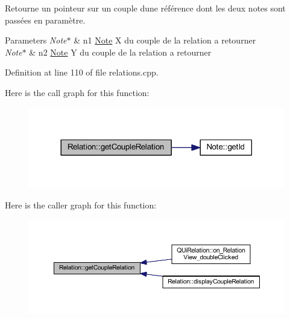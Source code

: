 Retourne un pointeur sur un couple d\textquotesingle{}une référence dont les deux notes sont passées en paramètre. 


\begin{DoxyParams}{Parameters}
{\em Note$\ast$} & n1 \hyperlink{class_note}{Note} X du couple de la relation a retourner \\
\hline
{\em Note$\ast$} & n2 \hyperlink{class_note}{Note} Y du couple de la relation a retourner \\
\hline
\end{DoxyParams}


Definition at line 110 of file relations.\+cpp.

Here is the call graph for this function\+:\nopagebreak
\begin{figure}[H]
\begin{center}
\leavevmode
\includegraphics[width=317pt]{class_relation_a086c39ecf396e3cfcb465fd9eea5a904_cgraph}
\end{center}
\end{figure}
Here is the caller graph for this function\+:\nopagebreak
\begin{figure}[H]
\begin{center}
\leavevmode
\includegraphics[width=350pt]{class_relation_a086c39ecf396e3cfcb465fd9eea5a904_icgraph}
\end{center}
\end{figure}
\mbox{\label{class_relation_a69211cc18aed20c1df97c4b73317a2e1}} 
